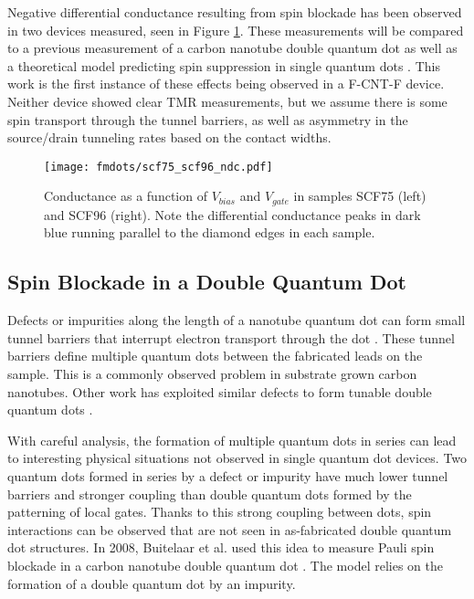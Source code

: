 Negative differential conductance resulting from spin blockade has been observed in two devices measured, seen in Figure \ref{fig:negative_differential_conductance}. These measurements will be compared to a previous measurement of a carbon nanotube double quantum dot \cite{Buitelaar2008} as well as a theoretical model predicting spin suppression in single quantum dots \cite{Weinmann1994}. This work is the first instance of these effects being observed in a F-CNT-F device. Neither device showed clear TMR measurements, but we assume there is some spin transport through the tunnel barriers, as well as asymmetry in the source/drain tunneling rates based on the contact widths.

\begin{figure}
    \centering
    \texttt{[image: fmdots/scf75\_scf96\_ndc.pdf]}
    \caption{Conductance as a function of $V_{bias}$ and $V_{gate}$ in samples SCF75 (left) and SCF96 (right). Note the differential conductance peaks in dark blue running parallel to the diamond edges in each sample.}
    \label{fig:negative_differential_conductance}
\end{figure}

\subsection{Spin Blockade in a Double Quantum Dot}
\label{sec:dqd_model}

Defects or impurities along the length of a nanotube quantum dot can form small tunnel barriers that interrupt electron transport through the dot \cite{McEuen1999, Bockrath2001}. These tunnel barriers define multiple quantum dots between the fabricated leads on the sample. This is a commonly observed problem in substrate grown carbon nanotubes. Other work has exploited similar defects to form tunable double quantum dots \cite{Mason2004, Jorgensen2007}.

With careful analysis, the formation of multiple quantum dots in series can lead to interesting physical situations not observed in single quantum dot devices. Two quantum dots formed in series by a defect or impurity have much lower tunnel barriers and stronger coupling than double quantum dots formed by the patterning of local gates. Thanks to this strong coupling between dots, spin interactions can be observed that are not seen in as-fabricated double quantum dot structures. In 2008, Buitelaar et al. used this idea to measure Pauli spin blockade in a carbon nanotube double quantum dot \cite{Buitelaar2008}. The model relies on the formation of a double quantum dot by an impurity.

